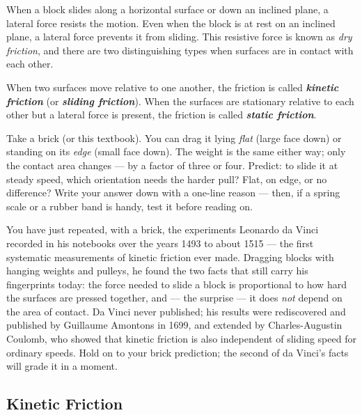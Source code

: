When a block slides along a horizontal surface or down an inclined plane, a lateral force resists the motion. Even when the block is at rest on an inclined plane, a lateral force prevents it from sliding. This resistive force is known as \textit{dry friction}, and
there are two distinguishing types when surfaces are in contact with each other.

When two surfaces move relative to one another, the friction is called \textbf{\textit{kinetic friction}} (or \textbf{\textit{sliding friction}}). When the surfaces are stationary relative to each other but a lateral force is present, the friction is called \textbf{\textit{static friction}}.

\begin{predictbox}
Take a brick (or this textbook). You can drag it lying \emph{flat} (large face
down) or standing on its \emph{edge} (small face down). The weight is the same
either way; only the contact area changes --- by a factor of three or four.
Predict: to slide it at steady speed, which orientation needs the harder
pull? Flat, on edge, or no difference? Write your answer down with a one-line
reason --- then, if a spring scale or a rubber band is handy, test it before
reading on.
\end{predictbox}

You have just repeated, with a brick, the experiments Leonardo da Vinci
recorded in his notebooks over the years 1493 to about 1515 --- the first
systematic measurements of kinetic friction ever made. Dragging blocks with
hanging weights and pulleys, he found the two facts that still carry his
fingerprints today: the force needed to slide a block is proportional to how
hard the surfaces are pressed together, and --- the surprise --- it does
\emph{not} depend on the area of contact. Da Vinci never published; his
results were rediscovered and published by Guillaume Amontons in 1699, and
extended by Charles-Augustin Coulomb, who showed that kinetic friction is
also independent of sliding speed for ordinary speeds. Hold on to your brick
prediction; the second of da Vinci's facts will grade it in a moment.

\subsection{Kinetic Friction}

